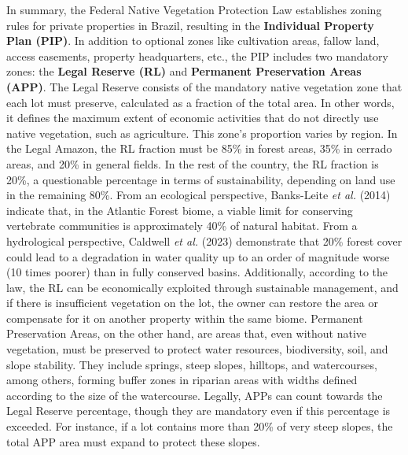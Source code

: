 \documentclass[./main_en.tex]{subfiles}
\begin{document}
\par In summary, the Federal Native Vegetation Protection Law establishes zoning rules for private properties in Brazil, resulting in the \textbf{Individual Property Plan (PIP)}. In addition to optional zones like cultivation areas, fallow land, access easements, property headquarters, etc., the PIP includes two mandatory zones: the \textbf{Legal Reserve (RL)} and \textbf{Permanent Preservation Areas (APP)}. The Legal Reserve consists of the mandatory native vegetation zone that each lot must preserve, calculated as a fraction of the total area. In other words, it defines the maximum extent of economic activities that do not directly use native vegetation, such as agriculture. This zone's proportion varies by region. In the Legal Amazon, the RL fraction must be 85\% in forest areas, 35\% in cerrado areas, and 20\% in general fields. In the rest of the country, the RL fraction is 20\%, a questionable percentage in terms of sustainability, depending on land use in the remaining 80\%. From an ecological perspective, Banks-Leite \textit{et al.} (2014) \cite{Banks-leite2014a} indicate that, in the Atlantic Forest biome, a viable limit for conserving vertebrate communities is approximately 40\% of natural habitat. From a hydrological perspective, Caldwell \textit{et al.} (2023) \cite{Caldwell2023} demonstrate that 20\% forest cover could lead to a degradation in water quality up to an order of magnitude worse (10 times poorer) than in fully conserved basins. Additionally, according to the law, the RL can be economically exploited through sustainable management, and if there is insufficient vegetation on the lot, the owner can restore the area or compensate for it on another property within the same biome. Permanent Preservation Areas, on the other hand, are areas that, even without native vegetation, must be preserved to protect water resources, biodiversity, soil, and slope stability. They include springs, steep slopes, hilltops, and watercourses, among others, forming buffer zones in riparian areas with widths defined according to the size of the watercourse. Legally, APPs can count towards the Legal Reserve percentage, though they are mandatory even if this percentage is exceeded. For instance, if a lot contains more than 20\% of very steep slopes, the total APP area must expand to protect these slopes.
\end{document}
